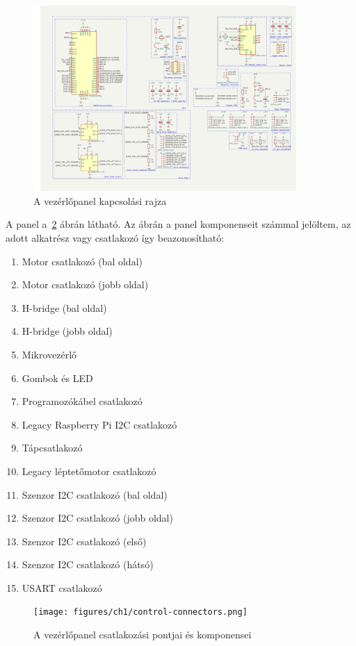 \begin{figure}
  \centering \includegraphics[width=100mm,
    keepaspectratio]{figures/ch1/movement-control-schematic.png}
  \caption{A vezérlőpanel kapcsolási rajza}
  \label{fig:ctrl_layout}
\end{figure}

A panel a~\ref{fig:ctrl_connectors} ábrán látható. Az ábrán a panel komponenseit
számmal jelöltem, az adott alkatrész vagy csatlakozó így beazonosítható:
\begin{enumerate}
\item Motor csatlakozó (bal oldal)
\item Motor csatlakozó (jobb oldal)
\item H-bridge (bal oldal)
\item H-bridge (jobb oldal)
\item Mikrovezérlő
\item Gombok és LED
\item Programozókábel csatlakozó
\item Legacy Raspberry Pi I2C csatlakozó
\item Tápcsatlakozó
\item Legacy léptetőmotor csatlakozó
\item Szenzor I2C csatlakozó (bal oldal)
\item Szenzor I2C csatlakozó (jobb oldal)
\item Szenzor I2C csatlakozó (első)
\item Szenzor I2C csatlakozó (hátsó)
\item USART csatlakozó
\end{enumerate}

\begin{figure}
  \centering \texttt{[image: figures/ch1/control-connectors.png]}
  \caption{A vezérlőpanel csatlakozási pontjai és komponensei}
  \label{fig:ctrl_connectors}
\end{figure}

